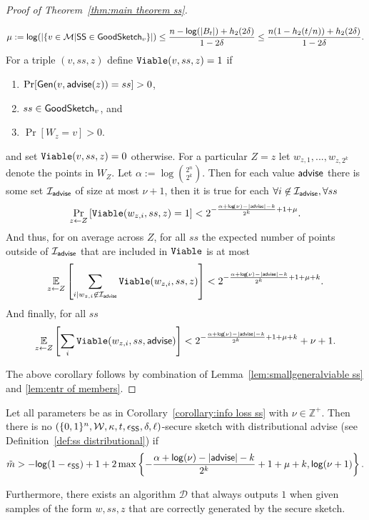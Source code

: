 \begin{proof}[Proof of Theorem~\ref{thm:main theorem ss}]
\begin{corollary}
    \[
    \mu:=\mathsf{log}\!\left(|\{v \in \mathcal{M} | {\mathsf{SS}} \in \mathsf{GoodSketch}_v\}|\right) \le \frac{n - \mathsf{log}\!\left(|B_t|\right) +h_2(2\delta)}{1-2\delta} \le \frac{n(1-h_2(t/n)) +h_2(2\delta)}{1-2\delta}.
    \]
For a triple $(v, ss, z)$ define $\mathtt{Viable}(v, ss, z)=1$ if
\begin{enumerate}
\itemsep0em
\item $\Pr[{\mathsf{Gen}}(v, {\mathsf{advise}}(z)) = ss]>0$,
\item $ss\in\mathsf{GoodSketch}_v$, and
\item $\Pr[W_z = v]>0$.
\end{enumerate}
and set $\mathtt{Viable}(v, ss, z)=0$ otherwise. 
 For a particular $Z=z$ let $w_{z,1},..., w_{z,2^k}$ denote the points in $W_Z$. Let $\alpha:= \log {2^n\choose 2^k}$.  
 Then for each value ${\mathsf{advise}}$ there is some set $\mathcal{I}_{{\mathsf{advise}}}$ of size at most $\nu+1$, then it is true for each $\forall i\not \in \mathcal{I}_{\mathsf{advise}}, \forall ss$
\[
\Pr_{z\leftarrow Z}\left[\mathtt{Viable}(w_{z,i},ss,z) =1\right]< 2^{-\frac{\alpha+\mathsf{log}\!\left(\nu\right)-|{\mathsf{advise}}|-k}{2^k}+1+\mu}.
\]
And thus, for on average across $Z$, for all $ss$ the expected number of points outside of $\mathcal{I}_{\mathsf{advise}}$ that are included in $\mathtt{Viable}$ is at most 
\begin{align*}
\operatorname*{\mathbb{E}}_{z\leftarrow Z} \left[\sum_{i | w_{z,i}\not\in\mathcal{I}_{\mathsf{advise}}} \mathtt{Viable}(w_{z,i}, ss, z) \right]< 2^{-\frac{\alpha+\mathsf{log}\!\left(\nu\right) - |{\mathsf{advise}}|-k}{2^k}+1+\mu+k}.
\end{align*}
And finally, for all $ss$
\begin{align*}
\operatorname*{\mathbb{E}}_{z\leftarrow Z} \left[\sum_{i }  \mathtt{Viable}(w_{z,i}, ss, {\mathsf{advise}})  \right]< 2^{-\frac{\alpha+\mathsf{log}\!\left(\nu\right)-|{\mathsf{advise}}|-k}{2^k}+1+\mu+k}+\nu+1.
\end{align*}
\end{corollary}
\noindent
The above corollary follows by combination of Lemma~\ref{lem:smallgeneralviable ss} and \ref{lem:entr of members}.
\end{proof}
\begin{lemma}
\label{lem:convert distinguisher ss}
Let all parameters be as in Corollary~\ref{corollary:info loss ss} with $\nu \in\mathbb{Z}^+$.  Then there is no $(\{0,1\}^n, \mathcal{W}, \kappa, t, \epsilon_{\mathsf{SS}}, \delta, \ell)$-secure sketch with distributional advise (see Definition~\ref{def:ss distributional}) if
\[
\tilde{m}> -\mathsf{log}\!\left(1-\epsilon_{\mathsf{SS}}\right) +1 + 2\max\left\{-\frac{\alpha+\mathsf{log}\!\left(\nu\right)-|{\mathsf{advise}}|-k}{2^k}+1+\mu+k, \mathsf{log}\!\left(\nu+1\right)\right\}.
\]

Furthermore, there exists an algorithm $\mathcal{D}$ that always outputs $1$ when given samples of the form $w, ss, z$ that are correctly generated by the secure sketch.
\end{lemma}
